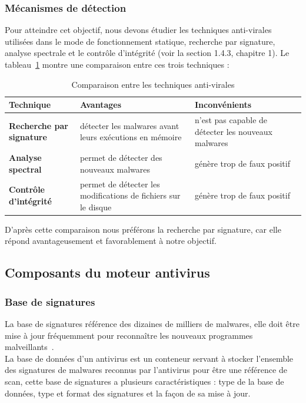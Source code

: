 \subsubsection{Mécanismes de détection }
Pour atteindre cet objectif, nous devons étudier  les techniques anti-virales utilisées dans le mode de fonctionnement statique, recherche par signature, analyse spectrale et le contrôle d'intégrité (voir la section 1.4.3, chapitre 1). Le tableau~\ref{comp} montre une comparaison entre ces trois techniques :
\begin{table}[H]
\begin{tabular}{|p{4.5cm}|p{5cm}|p{5cm}|}
\hline \textbf{Technique} &  \textbf{Avantages} & \textbf{Inconvénients}\\
\hline \textbf{Recherche par signature} & détecter les malwares avant leurs exécutions en
mémoire & n'est pas capable de détecter les nouveaux malwares\\
\hline \textbf{Analyse spectral} & permet de détecter des nouveaux malwares & génère trop de faux positif \\
\hline \textbf{Contrôle d'intégrité}& permet de détecter les modifications de fichiers sur le disque & génère trop de faux positif \\
\hline
\end{tabular}
\caption{Comparaison entre les techniques anti-virales}
\label{comp}
\end{table}


D'après cette comparaison nous préférons la  recherche par signature, car elle répond avantageusement et favorablement à notre objectif.
\subsection{Composants du moteur antivirus}
\subsubsection{Base de signatures}
La base de signatures référence des dizaines de milliers de malwares, elle doit être mise à jour fréquemment pour reconnaître les nouveaux programmes malveillants~\cite{viruslist}.\\

La base de données d'un antivirus est un conteneur servant à stocker  l'ensemble des  signatures de malwares reconnus par l'antivirus pour être une référence de scan, cette base de signatures a plusieurs caractéristiques : type de la base de données, type et format des signatures et la façon de sa mise à jour.
